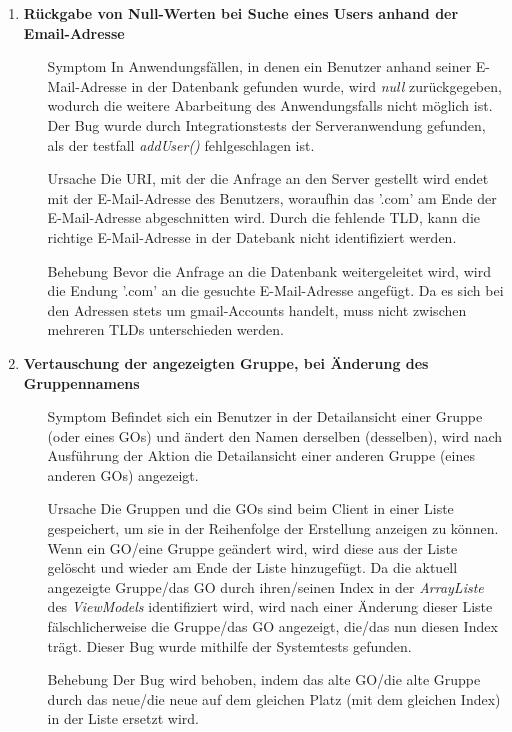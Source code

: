 \documentclass[11pt,a4paper]{scrartcl}
\def\threedigits#1{%
  \ifnum#1<100 0\fi
  \ifnum#1<10 0\fi
  \number#1}
\begin{document}
\begin{enumerate}[label={\textbf{/B\protect\threedigits{\theenumi}0/}}, leftmargin=*]
\item \textbf{Rückgabe von Null-Werten bei Suche eines Users anhand der Email-Adresse}
	\begin{itemize}
		\item[Symptom] In Anwendungsfällen, in denen ein Benutzer anhand seiner E-Mail-Adresse in der Datenbank gefunden wurde, wird \textit{null} zurückgegeben, wodurch die weitere Abarbeitung des Anwendungsfalls nicht möglich ist. Der Bug wurde durch Integrationstests der Serveranwendung gefunden, als der testfall \textit{addUser()} fehlgeschlagen ist.
		\item[Ursache] Die URI, mit der die Anfrage an den Server gestellt wird endet mit der E-Mail-Adresse des Benutzers, woraufhin das '.com' am Ende der E-Mail-Adresse abgeschnitten wird. Durch die fehlende TLD, kann die richtige E-Mail-Adresse in der Datebank nicht identifiziert werden.
		\item[Behebung] Bevor die Anfrage an die Datenbank weitergeleitet wird, wird die Endung '.com' an die gesuchte E-Mail-Adresse angefügt. Da es sich bei den Adressen stets um gmail-Accounts handelt, muss nicht zwischen mehreren TLDs unterschieden werden.
	\end{itemize}
	
\item \textbf{Vertauschung der angezeigten Gruppe, bei Änderung des Gruppennamens}
	\begin{itemize}
		\item[Symptom] Befindet sich ein Benutzer in der Detailansicht einer Gruppe (oder eines GOs) und ändert den Namen derselben (desselben), wird nach Ausführung der Aktion die Detailansicht einer anderen Gruppe (eines anderen GOs) angezeigt.
		\item[Ursache] Die Gruppen und die GOs sind beim Client in einer Liste gespeichert, um sie in der Reihenfolge der Erstellung anzeigen zu können. Wenn ein GO/eine Gruppe geändert wird, wird diese aus der Liste gelöscht und wieder am Ende der Liste hinzugefügt. Da die aktuell angezeigte Gruppe/das GO durch ihren/seinen Index in der \textit{ArrayListe} des \textit{ViewModels} identifiziert wird, wird nach einer Änderung dieser Liste fälschlicherweise die Gruppe/das GO angezeigt, die/das nun diesen Index trägt. Dieser Bug wurde mithilfe der Systemtests gefunden.
		\item[Behebung] Der Bug wird behoben, indem das alte GO/die alte Gruppe durch das neue/die neue auf dem gleichen Platz (mit dem gleichen Index) in der Liste ersetzt wird.
	\end{itemize}
	

\end{enumerate}
\end{document}
